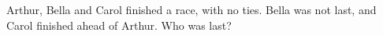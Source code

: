 Arthur, Bella and Carol finished a race, with no ties. Bella was not last, and Carol finished ahead of Arthur. Who was last?
